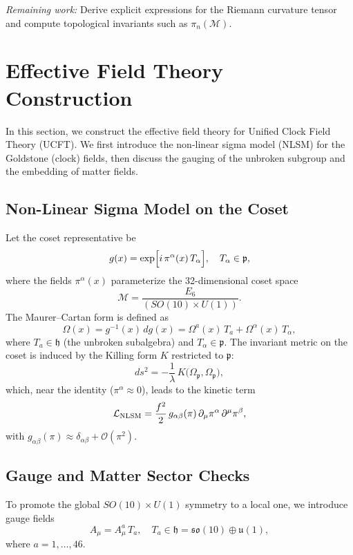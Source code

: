 \documentclass[aps,prd,preprint,groupedaddress]{revtex4-2}
\begin{document}
\emph{Remaining work:} Derive explicit expressions for the Riemann curvature tensor and compute topological invariants such as $\pi_n(\mathcal{M})$.

\section{Effective Field Theory Construction}
\label{sec:eft_construction}

In this section, we construct the effective field theory for Unified Clock Field Theory (UCFT).
We first introduce the non-linear sigma model (NLSM) for the Goldstone (clock) fields, then discuss the gauging of the unbroken subgroup and the embedding of matter fields.

\subsection{Non-Linear Sigma Model on the Coset}

Let the coset representative be
\[
g(x) = \exp\Bigl[i\,\pi^\alpha(x)\,T_\alpha\Bigr], \quad T_\alpha\in \mathfrak{p},
\]
where the fields \(\pi^\alpha(x)\) parameterize the 32-dimensional coset space
\[
\mathcal{M} = \frac{E_6}{(SO(10)\times U(1))}.
\]
The Maurer--Cartan form is defined as
\[
\Omega(x) = g^{-1}(x)\,dg(x) = \Omega^a(x)\,T_a + \Omega^\alpha(x)\,T_\alpha,
\]
where \(T_a\in \mathfrak{h}\) (the unbroken subalgebra) and \(T_\alpha\in \mathfrak{p}\).
The invariant metric on the coset is induced by the Killing form \(K\) restricted to \(\mathfrak{p}\):
\[
ds^2 = -\frac{1}{\lambda}\,K\bigl(\Omega_{\mathfrak{p}},\Omega_{\mathfrak{p}}\bigr),
\]
which, near the identity (\(\pi^\alpha \approx 0\)), leads to the kinetic term
\[
\mathcal{L}_{\rm NLSM} = \frac{f^2}{2}\,g_{\alpha\beta}(\pi)\,\partial_\mu\pi^\alpha\,\partial^\mu\pi^\beta,
\]
with \(g_{\alpha\beta}(\pi) \approx \delta_{\alpha\beta} + \mathcal{O}(\pi^2)\).

\subsection{Gauge and Matter Sector Checks}
\label{sec:gauge_matter_checks}

To promote the global \(SO(10)\times U(1)\) symmetry to a local one, we introduce gauge fields 
\[
A_\mu = A_\mu^a\,T_a,\quad T_a\in \mathfrak{h} = \mathfrak{so}(10)\oplus \mathfrak{u}(1),
\]
where \(a=1,\dots,46\).
\end{document}
